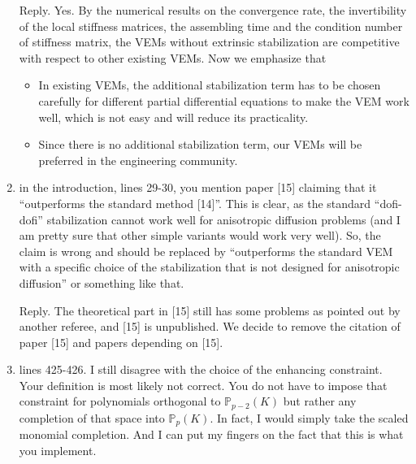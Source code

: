 \documentclass[10pt]{amsart}
\theoremstyle{definition}
\theoremstyle{remark}
\begin{document}
\begin{enumerate}[1.]
\smallskip \noindent \textcolor[rgb]{1.00,0.00,0.00}{Reply.}
Yes. By the numerical results on the convergence rate, the invertibility of the local stiffness matrices, the assembling time and the condition number of stiffness
matrix,
the VEMs without extrinsic stabilization are competitive with respect to other existing VEMs.
Now we emphasize that
\begin{itemize}
\item
In existing VEMs, the additional stabilization term has to be chosen carefully for different partial differential equations to make the VEM work well, which is not easy and will reduce its practicality.
\item 
Since there is no additional stabilization term, our VEMs will be preferred in the engineering community. 
\end{itemize}





\medskip

\item \textsf{in the introduction, lines 29-30, you mention paper [15] claiming that it ``outperforms the standard method [14]''. This is clear, as the standard ``dofi-dofi'' stabilization cannot work well for anisotropic diffusion problems (and I am pretty sure that other simple variants would work very well). So, the claim is wrong and should be replaced by ``outperforms the standard VEM with a specific choice of the stabilization that is not designed for anisotropic diffusion'' or something like that.}

\smallskip \noindent \textcolor[rgb]{1.00,0.00,0.00}{Reply.}
The theoretical part in [15] still has some problems as pointed out by another referee, and [15] is unpublished. We decide to remove the citation of paper [15] and papers depending on [15].


\medskip

\item \textsf{lines 425-426. I still disagree with the choice of the enhancing constraint. Your definition is most likely not correct. You do not have to impose that constraint for polynomials orthogonal to $\mathbb P_{p-2}(K)$ but rather any completion of that space into $\mathbb P_p(K)$. In fact, I would simply take the scaled monomial completion. And I can put my fingers on the fact that this is what you implement.}


\end{enumerate}
\end{document}
